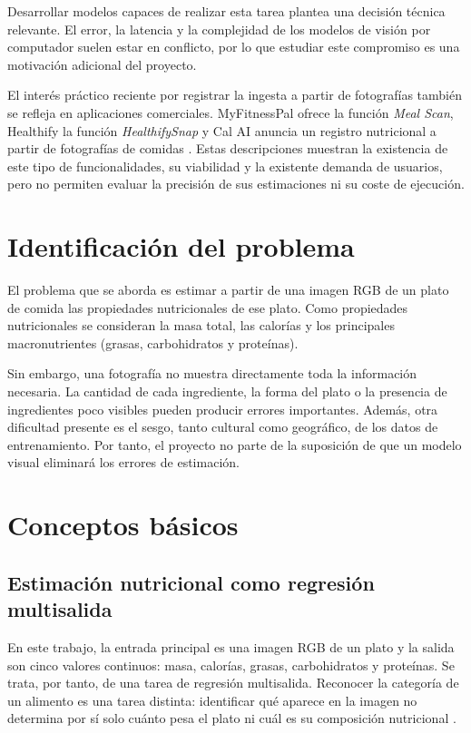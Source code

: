Desarrollar modelos capaces de realizar esta tarea plantea una decisión técnica relevante. 
El error, la latencia y la complejidad de los modelos de visión por computador suelen estar en conflicto, 
por lo que estudiar este compromiso es una motivación adicional del proyecto.

El interés práctico reciente por registrar la ingesta a partir de fotografías
también se refleja en aplicaciones comerciales. MyFitnessPal ofrece la función
\emph{Meal Scan}, Healthify la función \emph{HealthifySnap} y Cal AI anuncia un
registro nutricional a partir de fotografías de comidas
\citep{HowUseMeal2026,Healthify,CalAIFood}.
Estas descripciones muestran la existencia de este tipo de funcionalidades, su viabilidad y la 
existente demanda de usuarios, pero no permiten evaluar la precisión de sus estimaciones ni su coste de ejecución.

\section{Identificación del problema}

El problema que se aborda es estimar a partir de una imagen RGB de un plato de comida las propiedades
nutricionales de ese plato. Como propiedades nutricionales se consideran la masa total, las calorías y 
los principales macronutrientes (grasas, carbohidratos y proteínas).

Sin embargo, una fotografía no muestra directamente toda la información necesaria. La cantidad de cada
ingrediente, la forma del plato o la presencia de ingredientes poco visibles
pueden producir errores importantes. Además, otra dificultad presente es el sesgo, tanto cultural como geográfico, de los datos de entrenamiento.
Por tanto, el proyecto no parte de la
suposición de que un modelo visual eliminará los errores de estimación.


\section{Conceptos básicos}

\subsection{Estimación nutricional como regresión multisalida}

En este trabajo, la entrada principal es una imagen RGB de un plato y la salida
son cinco valores continuos: masa, calorías, grasas, carbohidratos y proteínas.
Se trata, por tanto, de una tarea de regresión multisalida. Reconocer la
categoría de un alimento es una tarea distinta: identificar qué aparece en la
imagen no determina por sí solo cuánto pesa el plato ni cuál es su composición
nutricional \citep{thamesNutrition5kAutomaticNutritional2021}.

